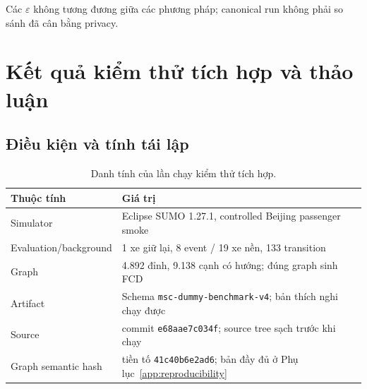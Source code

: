 \documentclass[12pt,a4paper,oneside]{report}
\begin{document}
Các $\varepsilon$ không tương đương giữa các phương pháp; canonical run không phải so sánh đã cân bằng privacy.

\chapter{Kết quả kiểm thử tích hợp và thảo luận}
\label{ch:results}

\begin{center}
\end{center}

\section{Điều kiện và tính tái lập}

\begin{table}[htbp]
\centering
\small
\caption{Danh tính của lần chạy kiểm thử tích hợp.}
\label{tab:run-identity}
\begin{tabularx}{\textwidth}{P{4.2cm}Y}
\toprule
\textbf{Thuộc tính} & \textbf{Giá trị} \\
\midrule
Simulator & Eclipse SUMO 1.27.1, controlled Beijing passenger smoke \\
Evaluation/background & 1 xe giữ lại, 8 event / 19 xe nền, 133 transition \\
Graph & 4.892 đỉnh, 9.138 cạnh có hướng; đúng graph sinh FCD \\
Artifact & Schema \texttt{msc-dummy-benchmark-v4}; bản thích nghi chạy được \\
Source & commit \texttt{e68aae7c034f}; source tree sạch trước khi chạy \\
Graph semantic hash & tiền tố \texttt{41c40b6e2ad6}; bản đầy đủ ở Phụ lục~\ref{app:reproducibility} \\
\bottomrule
\end{tabularx}
\end{table}
\end{document}
